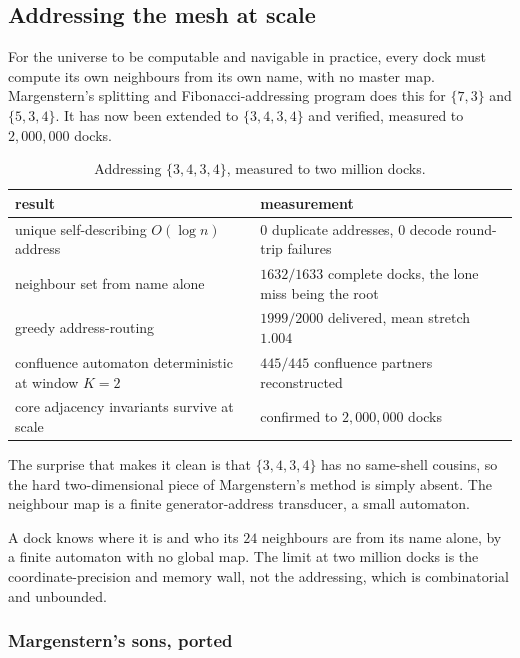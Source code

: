 \subsection{Addressing the mesh at scale}

For the universe to be computable and navigable in practice, every dock must compute its own neighbours from its own name, with no master map. Margenstern's splitting and Fibonacci-addressing program does this for $\{7,3\}$ and $\{5,3,4\}$. It has now been extended to $\{3,4,3,4\}$ and verified, measured to $2{,}000{,}000$ docks.

\begin{table}[ht]
\centering
\begin{tabular}{@{}ll@{}}
\toprule
result & measurement \\
\midrule
unique self-describing $O(\log n)$ address & $0$ duplicate addresses, $0$ decode round-trip failures \\
neighbour set from name alone & $1632/1633$ complete docks, the lone miss being the root \\
greedy address-routing & $1999/2000$ delivered, mean stretch $1.004$ \\
confluence automaton deterministic at window $K=2$ & $445/445$ confluence partners reconstructed \\
core adjacency invariants survive at scale & confirmed to $2{,}000{,}000$ docks \\
\bottomrule
\end{tabular}
\caption{Addressing $\{3,4,3,4\}$, measured to two million docks.}
\label{tab:addressing-scale}
\end{table}

The surprise that makes it clean is that $\{3,4,3,4\}$ has no same-shell cousins, so the hard two-dimensional piece of Margenstern's method is simply absent. The neighbour map is a finite generator-address transducer, a small automaton.

\begin{result}
A dock knows where it is and who its $24$ neighbours are from its name alone, by a finite automaton with no global map. The limit at two million docks is the coordinate-precision and memory wall, not the addressing, which is combinatorial and unbounded.
\end{result}

\subsubsection{Margenstern's sons, ported}

